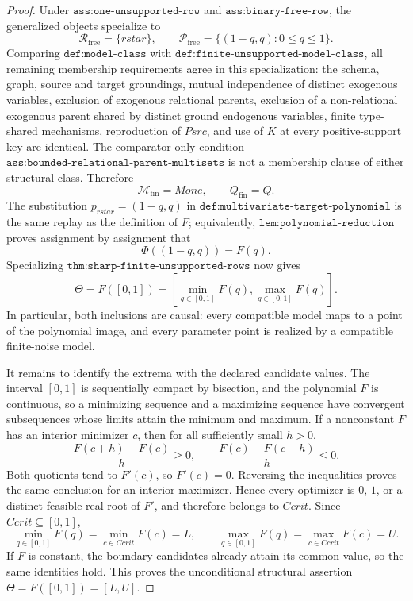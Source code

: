 \documentclass{article}
\begin{document}
\begin{proof}
Under \(\texttt{ass:one-unsupported-row}\) and \(\texttt{ass:binary-free-row}\), the generalized objects specialize to
\[
 \mathcal R_{\mathrm{free}}=\{rstar\},
 \qquad
 \mathcal P_{\mathrm{free}}=\{(1-q,q):0\leq q\leq1\}.
\]
Comparing \(\texttt{def:model-class}\) with \(\texttt{def:finite-unsupported-model-class}\), all remaining membership requirements agree in this specialization: the schema, graph, source and target groundings, mutual independence of distinct exogenous variables, exclusion of exogenous relational parents, exclusion of a non-relational exogenous parent shared by distinct ground endogenous variables, finite type-shared mechanisms, reproduction of \(Psrc\), and use of \(K\) at every positive-support key are identical.  The comparator-only condition \(\texttt{ass:bounded-relational-parent-multisets}\) is not a membership clause of either structural class.  Therefore
\[
 \mathcal M_{\mathrm{fin}}=Mone,
 \qquad Q_{\mathrm{fin}}=Q.
\]
The substitution \(p_{rstar}=(1-q,q)\) in \(\texttt{def:multivariate-target-polynomial}\) is the same replay as the definition of \(F\); equivalently, \(\texttt{lem:polynomial-reduction}\) proves assignment by assignment that
\[
 \Phi((1-q,q))=F(q).
\]
Specializing \(\texttt{thm:sharp-finite-unsupported-rows}\) now gives
\[
 \Theta=F([0,1])
 =\left[\min_{q\in[0,1]}F(q),
         \max_{q\in[0,1]}F(q)\right].
\]
In particular, both inclusions are causal: every compatible model maps to a point of the polynomial image, and every parameter point is realized by a compatible finite-noise model.

It remains to identify the extrema with the declared candidate values.  The interval \([0,1]\) is sequentially compact by bisection, and the polynomial \(F\) is continuous, so a minimizing sequence and a maximizing sequence have convergent subsequences whose limits attain the minimum and maximum.  If a nonconstant \(F\) has an interior minimizer \(c\), then for all sufficiently small \(h>0\),
\[
 \frac{F(c+h)-F(c)}{h}\geq0,
 \qquad
 \frac{F(c)-F(c-h)}{h}\leq0.
\]
Both quotients tend to \(F'(c)\), so \(F'(c)=0\).  Reversing the inequalities proves the same conclusion for an interior maximizer.  Hence every optimizer is \(0\), \(1\), or a distinct feasible real root of \(F'\), and therefore belongs to \(Ccrit\).  Since \(Ccrit\subseteq[0,1]\),
\[
 \min_{q\in[0,1]}F(q)=\min_{c\in Ccrit}F(c)=L,
 \qquad
 \max_{q\in[0,1]}F(q)=\max_{c\in Ccrit}F(c)=U.
\]
If \(F\) is constant, the boundary candidates already attain its common value, so the same identities hold.  This proves the unconditional structural assertion \(\Theta=F([0,1])=[L,U]\).


\end{proof}
\end{document}
